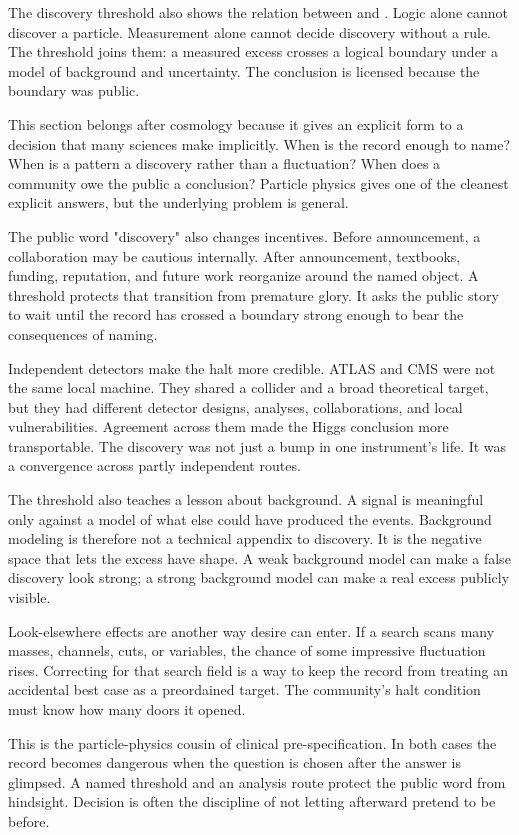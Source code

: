 The discovery threshold also shows the relation between  and
. Logic alone cannot discover a particle. Measurement alone
cannot decide discovery without a rule. The threshold joins them: a measured
excess crosses a logical boundary under a model of background and uncertainty.
The conclusion is licensed because the boundary was public.

This section belongs after cosmology because it gives an explicit form to a
decision that many sciences make implicitly. When is the record enough to
name? When is a pattern a discovery rather than a fluctuation? When does a
community owe the public a conclusion? Particle physics gives one of the
cleanest explicit answers, but the underlying problem is general.

The public word "discovery" also changes incentives. Before announcement, a
collaboration may be cautious internally. After announcement, textbooks,
funding, reputation, and future work reorganize around the named object. A
threshold protects that transition from premature glory. It asks the public
story to wait until the record has crossed a boundary strong enough to bear
the consequences of naming.

Independent detectors make the halt more credible. ATLAS and CMS were not the
same local machine. They shared a collider and a broad theoretical target,
but they had different detector designs, analyses, collaborations, and local
vulnerabilities. Agreement across them made the Higgs conclusion more
transportable. The discovery was not just a bump in one instrument's life.
It was a convergence across partly independent routes.

The threshold also teaches a lesson about background. A signal is meaningful
only against a model of what else could have produced the events. Background
modeling is therefore not a technical appendix to discovery. It is the
negative space that lets the excess have shape. A weak background model can
make a false discovery look strong; a strong background model can make a real
excess publicly visible.

Look-elsewhere effects are another way desire can enter. If a search scans
many masses, channels, cuts, or variables, the chance of some impressive
fluctuation rises. Correcting for that search field is a way to keep the
record from treating an accidental best case as a preordained target. The
community's halt condition must know how many doors it opened.

This is the particle-physics cousin of clinical pre-specification. In both
cases the record becomes dangerous when the question is chosen after the
answer is glimpsed. A named threshold and an analysis route protect the
public word from hindsight. Decision is often the discipline of not letting
afterward pretend to be before.

